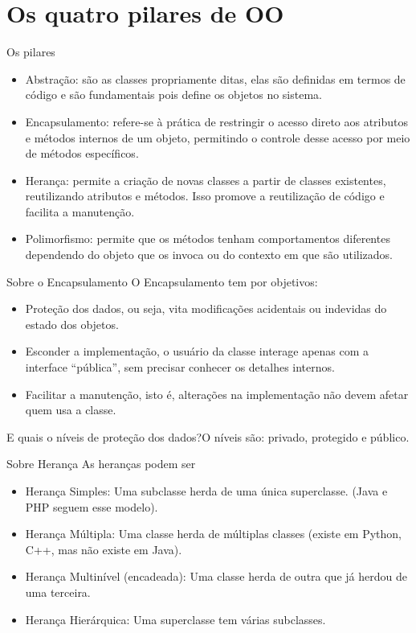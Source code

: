 \section{Os quatro pilares de OO}

\begin{frame}{Os pilares}
  \begin{itemize}
    \item Abstração: são as classes propriamente ditas, elas são definidas em termos de código e são fundamentais pois define os objetos no sistema.\pause
    \item Encapsulamento: refere-se à prática de restringir o acesso direto aos atributos e métodos internos de um objeto, permitindo o controle desse acesso por meio de métodos específicos.\pause
    \item Herança: permite a criação de novas classes a partir de classes existentes, reutilizando atributos e métodos. Isso promove a reutilização de código e facilita a manutenção.\pause
    \item Polimorfismo: permite que os métodos tenham comportamentos diferentes dependendo do objeto que os invoca ou do contexto em que são utilizados.
  \end{itemize}
\end{frame}

\begin{frame}{Sobre o Encapsulamento}
  O Encapsulamento tem por objetivos:
  \begin{itemize}
    \item Proteção dos dados, ou seja, vita modificações acidentais ou indevidas do estado dos objetos.
    \item Esconder a implementação, o usuário da classe interage apenas com a interface ``pública'', sem precisar conhecer os detalhes internos.
    \item Facilitar a manutenção, isto é, alterações na implementação não devem afetar quem usa a classe.
  \end{itemize}
  \pause
  E quais o níveis de proteção dos dados?\pause O níveis são: privado, protegido e público.
\end{frame}

\begin{frame}{Sobre Herança}
  As heranças podem ser
  \begin{itemize}
    \item Herança Simples: Uma subclasse herda de uma única superclasse. (Java e PHP seguem esse modelo).
    \item Herança Múltipla: Uma classe herda de múltiplas classes (existe em Python, C++, mas não existe em Java).
    \item Herança Multinível (encadeada): Uma classe herda de outra que já herdou de uma terceira.
    \item Herança Hierárquica: Uma superclasse tem várias subclasses.
  \end{itemize}
\end{frame}

